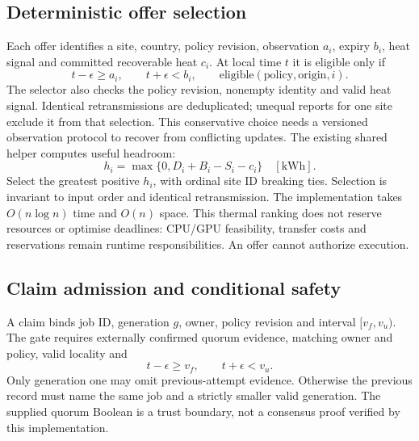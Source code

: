 \subsection{Deterministic offer selection}
Each offer identifies a site, country, policy revision, observation $a_i$, expiry $b_i$, heat
signal and committed recoverable heat $c_i$. At local time $t$ it is eligible only if
\begin{equation}
 t-\epsilon\ge a_i,\qquad t+\epsilon<b_i,\qquad
 \mathrm{eligible}(\mathrm{policy},\mathrm{origin},i).
\end{equation}
The selector also checks the policy revision, nonempty identity and valid heat signal. Identical
retransmissions are deduplicated; unequal reports for one site exclude it from that selection.
This conservative choice needs a versioned observation protocol to recover from conflicting updates.
The existing shared helper computes useful headroom:
\begin{equation}
 h_i=\max\{0,D_i+B_i-S_i-c_i\}\quad[\mathrm{kWh}].
\end{equation}
Select the greatest positive $h_i$, with ordinal site ID breaking ties. Selection is invariant to
input order and identical retransmission. The implementation takes $O(n\log n)$ time and $O(n)$
space. This thermal ranking does not reserve resources or optimise deadlines: CPU/GPU feasibility,
transfer costs and reservations remain runtime responsibilities. An offer cannot authorize execution.

\subsection{Claim admission and conditional safety}
A claim binds job ID, generation $g$, owner, policy revision and interval $[v_f,v_u)$. The gate
requires externally confirmed quorum evidence, matching owner and policy, valid locality and
\begin{equation}
 t-\epsilon\ge v_f,\qquad t+\epsilon<v_u. \label{eq:federated-admission}
\end{equation}
Only generation one may omit previous-attempt evidence. Otherwise the previous record must name
the same job and a strictly smaller valid generation. The supplied quorum Boolean is a trust
boundary, not a consensus proof verified by this implementation.


